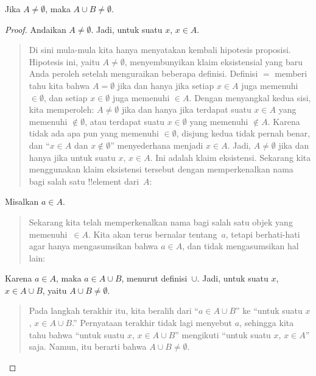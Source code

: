 \documentclass[../../../include/open-logic-section]{subfiles}
\begin{document}
\begin{prop}
Jika $A \neq \emptyset$, maka $A \cup B \neq \emptyset$.
\end{prop}

\begin{proof}
  Andaikan $A \neq \emptyset$. Jadi, untuk suatu $x$, $x \in A$.
  \begin{quote}
    Di sini mula-mula kita hanya menyatakan kembali hipotesis
    proposisi. Hipotesis ini, yaitu $A \neq \emptyset$, menyembunyikan
    klaim eksistensial yang baru Anda peroleh setelah menguraikan
    beberapa definisi. Definisi $=$ memberi tahu kita bahwa $A =
    \emptyset$ jika dan hanya jika setiap $x \in A$ juga memenuhi
    $\in \emptyset$, dan setiap $x \in \emptyset$ juga memenuhi $\in
    A$. Dengan menyangkal kedua sisi, kita memperoleh: $A \neq
    \emptyset$ jika dan hanya jika terdapat suatu $x \in A$ yang
    memenuhi $\notin \emptyset$, atau terdapat suatu $x \in
    \emptyset$ yang memenuhi $\notin A$. Karena tidak ada apa pun
    yang memenuhi $\in \emptyset$, disjung kedua tidak pernah benar,
    dan ``$x \in A$ dan $x \notin \emptyset$'' menyederhana menjadi
    $x \in A$. Jadi, $A \neq \emptyset$ jika dan hanya jika untuk suatu
    $x$, $x \in A$. Ini adalah klaim eksistensi. Sekarang kita
    menggunakan klaim eksistensi tersebut dengan memperkenalkan nama
    bagi salah satu !!{element} dari~$A$:
  \end{quote}
  Misalkan $a \in A$.
  \begin{quote}
    Sekarang kita telah memperkenalkan nama bagi salah satu objek yang
    memenuhi~$\in A$. Kita akan terus bernalar tentang~$a$, tetapi
    berhati-hati agar hanya mengasumsikan bahwa $a \in A$, dan tidak
    mengasumsikan hal lain:
  \end{quote}
  Karena $a \in A$, maka $a \in A \cup B$, menurut definisi~$\cup$.
  Jadi, untuk suatu $x$, $x \in A \cup B$, yaitu $A \cup B \neq
  \emptyset$.
  \begin{quote}
    Pada langkah terakhir itu, kita beralih dari ``$a \in A \cup B$''
    ke ``untuk suatu $x$, $x \in A \cup B$.'' Pernyataan terakhir tidak
    lagi menyebut $a$, sehingga kita tahu bahwa ``untuk suatu $x$, $x
    \in A \cup B$'' mengikuti ``untuk suatu $x$, $x \in A$'' saja.
    Namun, itu berarti bahwa $A \cup B \neq \emptyset$.
  \end{quote}
\end{proof}
\end{document}
